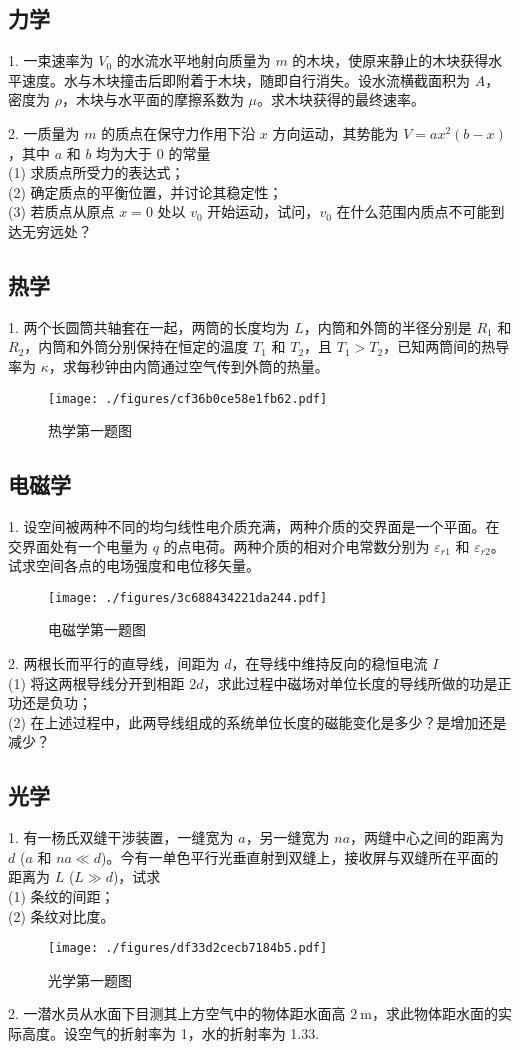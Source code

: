 \subsection{力学}
1. 一束速率为 $V_{0}$ 的水流水平地射向质量为 $m$ 的木块，使原来静止的木块获得水平速度。水与木块撞击后即附着于木块，随即自行消失。设水流横截面积为 $A$，密度为 $\rho$，木块与水平面的摩擦系数为 $\mu$。求木块获得的最终速率。

2. 一质量为 $m$ 的质点在保守力作用下沿 $x$ 方向运动，其势能为 $V=a x^{2}(b-x)$，其中 $a$ 和 $b$ 均为大于 0 的常量\\
(1) 求质点所受力的表达式；\\
(2) 确定质点的平衡位置，并讨论其稳定性；\\
(3) 若质点从原点 $x=0$ 处以 $v_{0}$ 开始运动，试问，$v_{0}$ 在什么范围内质点不可能到达无穷远处？
\subsection{热学}
1. 两个长圆筒共轴套在一起，两筒的长度均为 $L$，内筒和外筒的半径分别是 $R_{1}$ 和 $R_{2}$，内筒和外筒分别保持在恒定的温度 $T_{1}$ 和 $T_{2}$，且 $T_{1}>T_{2}$，已知两筒间的热导率为 $\kappa$，求每秒钟由内筒通过空气传到外筒的热量。
\begin{figure}[ht]
\centering
\texttt{[image: ./figures/cf36b0ce58e1fb62.pdf]}
\caption{热学第一题图} \label{fig_NJU16_1}
\end{figure}
\subsection{电磁学}
1. 设空间被两种不同的均匀线性电介质充满，两种介质的交界面是一个平面。在交界面处有一个电量为 $q$ 的点电荷。两种介质的相对介电常数分别为 $\varepsilon_{r 1}$ 和 $\varepsilon_{r 2}$。试求空间各点的电场强度和电位移矢量。
\begin{figure}[ht]
\centering
\texttt{[image: ./figures/3c688434221da244.pdf]}
\caption{电磁学第一题图} \label{fig_NJU16_2}
\end{figure}
2. 两根长而平行的直导线，间距为 $d$，在导线中维持反向的稳恒电流 $I$\\
(1) 将这两根导线分开到相距 $2 d$，求此过程中磁场对单位长度的导线所做的功是正功还是负功；\\
(2) 在上述过程中，此两导线组成的系统单位长度的磁能变化是多少？是增加还是减少？
\subsection{光学}
1. 有一杨氏双缝干涉装置，一缝宽为 $a$，另一缝宽为 $na$，两缝中心之间的距离为 $d$ ($a$ 和 $na \ll d$)。今有一单色平行光垂直射到双缝上，接收屏与双缝所在平面的距离为 $L$ ($L \gg d$)，试求\\
(1) 条纹的间距；\\
(2) 条纹对比度。
\begin{figure}[ht]
\centering
\texttt{[image: ./figures/df33d2cecb7184b5.pdf]}
\caption{光学第一题图} \label{fig_NJU16_3}
\end{figure}
2. 一潜水员从水面下目测其上方空气中的物体距水面高 $2 \mathrm{~m}$，求此物体距水面的实际高度。设空气的折射率为 1，水的折射率为 1.33.
